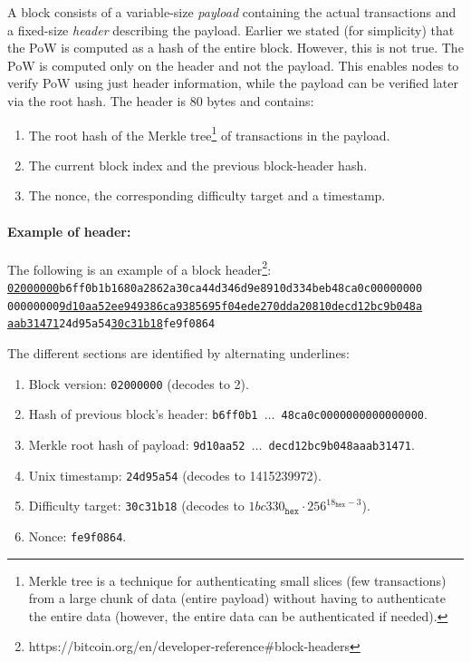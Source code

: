 \documentclass[]{report}   %
\begin{document}
A block consists of a variable-size {\em payload} containing the actual transactions and a fixed-size {\em header} describing the payload. 
Earlier we stated (for simplicity) that the PoW is computed as a hash of the entire block. However, this is not true. The PoW is computed only on the header and not the payload. This enables nodes to verify PoW using just header information, while the payload can be verified later via the root hash. 
The header is 80 bytes and contains: 
\begin{enumerate}
	\item The root hash of the Merkle tree\footnote{Merkle tree is a technique for authenticating small slices (few transactions) from a large chunk of data (entire payload) without having to authenticate the entire data (however, the entire data can be authenticated if needed).} of transactions in the payload.
	\item The current block index and the previous block-header hash.
	\item The nonce, the corresponding difficulty target and a timestamp.
\end{enumerate}


\paragraph{Example of header:} The following is an example of a block header\footnote{https://bitcoin.org/en/developer-reference\#block-headers}:\\
\texttt{\underline{02000000}b6ff0b1b1680a2862a30ca44d346d9e8910d334beb48ca0c00000000}\\
\texttt{00000000\underline{9d10aa52ee949386ca9385695f04ede270dda20810decd12bc9b048a}}\\
\texttt{\underline{aab31471}24d95a54\underline{30c31b18}fe9f0864}

The different sections are identified by alternating underlines:
\begin{enumerate}
	\item Block version: \texttt{02000000} (decodes to 2).
	\item Hash of previous block's header: \texttt{b6ff0b1 $\ldots$ 48ca0c0000000000000000}.
	\item Merkle root hash of payload: \texttt{9d10aa52 $\ldots$    decd12bc9b048aaab31471}.
	\item Unix timestamp: \texttt{24d95a54} (decodes to 1415239972).
	\item Difficulty target: \texttt{30c31b18} (decodes to $1bc330_{\texttt{hex}} \cdot 256^{18_{\texttt{hex}}-3}$).
	\item Nonce: \texttt{fe9f0864}.
\end{enumerate}
	
\end{document}
